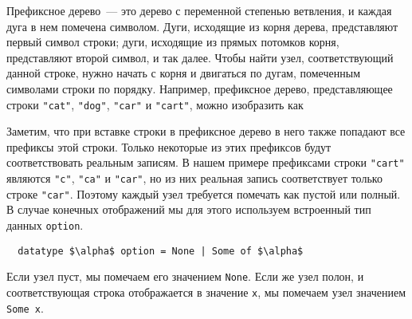 Префиксное дерево~--- это дерево с переменной степенью ветвления, и
каждая дуга в нем помечена символом. Дуги, исходящие из корня дерева,
представляют первый символ строки; дуги, исходящие из прямых потомков
корня, представляют второй символ, и так далее. Чтобы найти узел,
соответствующий данной строке, нужно начать с корня и двигаться по
дугам, помеченным символами строки по порядку.  Например, префиксное
дерево, представляющее строки \lstinline!"cat"!, \lstinline!"dog"!,
\lstinline!"car"! и \lstinline!"cart"!, можно изобразить как
\begin{center}
  
\end{center}
Заметим, что при вставке строки в префиксное дерево в него также
попадают все префиксы этой строки. Только некоторые из этих префиксов
будут соответствовать реальным записям.  В нашем примере префиксами
строки \lstinline!"cart"! являются \lstinline!"c"!, \lstinline!"ca"! и \lstinline!"car"!, но
из них реальная запись соответствует только строке \lstinline!"car"!. Поэтому
каждый узел требуется помечать как пустой или полный. В случае
конечных отображений мы для этого используем встроенный тип данных
\lstinline!option!.
\begin{lstlisting}
  datatype $\alpha$ option = None | Some of $\alpha$
\end{lstlisting}
Если узел пуст, мы помечаем его значением \lstinline!None!. Если же
узел полон, и соответствующая строка отображается в значение
\lstinline!x!, мы помечаем узел значением \lstinline!Some x!.

